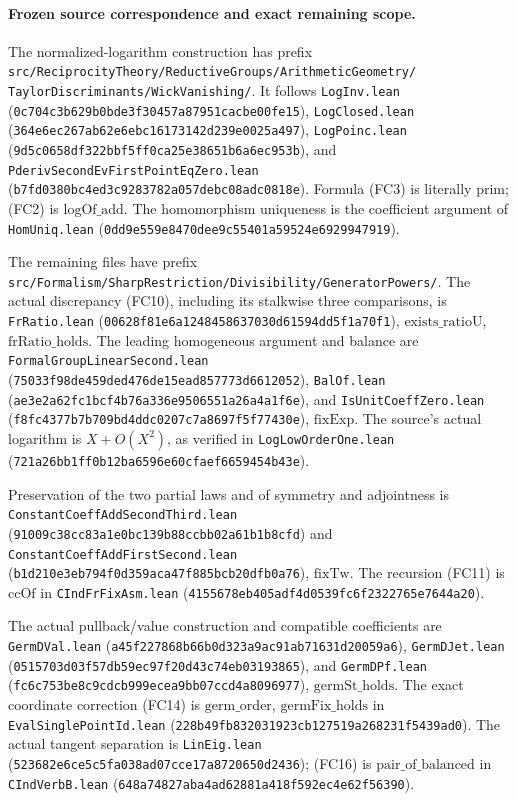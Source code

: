 \paragraph{Frozen source correspondence and exact remaining scope.}
The normalized-logarithm construction has prefix
\texttt{src/ReciprocityTheory/ReductiveGroups/ArithmeticGeometry/}
\texttt{TaylorDiscriminants/WickVanishing/}.
It follows \texttt{LogInv.lean}
(\texttt{0c704c3b629b0bde3f30457a87951cacbe00fe15}),
\texttt{LogClosed.lean}
(\texttt{364e6ec267ab62e6ebc16173142d239e0025a497}),
\texttt{LogPoinc.lean}
(\texttt{9d5c0658df322bbf5ff0ca25e38651b6a6ec953b}),
and \texttt{PderivSecondEvFirstPointEqZero.lean}
(\texttt{b7fd0380bc4ed3c9283782a057debc08adc0818e}).
Formula (FC3) is literally \(\mathrm{prim}\);
(FC2) is \(\mathrm{logOf\_add}\).
The homomorphism uniqueness is the coefficient argument
of \texttt{HomUniq.lean}
(\texttt{0dd9e559e8470dee9c55401a59524e6929947919}).

The remaining files have prefix
\texttt{src/Formalism/SharpRestriction/Divisibility/GeneratorPowers/}.
The actual discrepancy (FC10), including its stalkwise
three comparisons, is \texttt{FrRatio.lean}
(\texttt{00628f81e6a1248458637030d61594dd5f1a70f1}),
\(\mathrm{exists\_ratioU}\), \(\mathrm{frRatio\_holds}\).
The leading homogeneous argument and balance are
\texttt{FormalGroupLinearSecond.lean}
(\texttt{75033f98de459ded476de15ead857773d6612052}),
\texttt{BalOf.lean}
(\texttt{ae3e2a62fc1bcf4b76a336e9506551a26a4a1f6e}),
and \texttt{IsUnitCoeffZero.lean}
(\texttt{f8fc4377b7b709bd4ddc0207c7a8697f5f77430e}),
\(\mathrm{fixExp}\).
The source's actual logarithm is \(X+O(X^2)\), as
verified in \texttt{LogLowOrderOne.lean}
(\texttt{721a26bb1ff0b12ba6596e60cfaef6659454b43e}).

Preservation of the two partial laws and of symmetry
and adjointness is
\texttt{ConstantCoeffAddSecondThird.lean}
(\texttt{91009c38cc83a1e0bc139b88ccbb02a61b1b8cfd})
and \texttt{ConstantCoeffAddFirstSecond.lean}
(\texttt{b1d210e3eb794f0d359aca47f885bcb20dfb0a76}),
\(\mathrm{fixTw}\).
The recursion (FC11) is \(\mathrm{ccOf}\) in
\texttt{CIndFrFixAsm.lean}
(\texttt{4155678eb405adf4d0539fc6f2322765e7644a20}).

The actual pullback/value construction and compatible
coefficients are \texttt{GermDVal.lean}
(\texttt{a45f227868b66b0d323a9ac91ab71631d20059a6}),
\texttt{GermDJet.lean}
(\texttt{0515703d03f57db59ec97f20d43c74eb03193865}),
and \texttt{GermDPf.lean}
(\texttt{fc6c753be8c9cdcb999ecea9bb07ccd4a8096977}),
\(\mathrm{germSt\_holds}\).
The exact coordinate correction (FC14) is
\(\mathrm{germ\_order}\), \(\mathrm{germFix\_holds}\)
in \texttt{EvalSinglePointId.lean}
(\texttt{228b49fb832031923cb127519a268231f5439ad0}).
The actual tangent separation is \texttt{LinEig.lean}
(\texttt{523682e6ce5c5fa038ad07cce17a8720650d2436});
(FC16) is \(\mathrm{pair\_of\_balanced}\) in
\texttt{CIndVerbB.lean}
(\texttt{648a74827aba4ad62881a418f592ec4e62f56390}).

